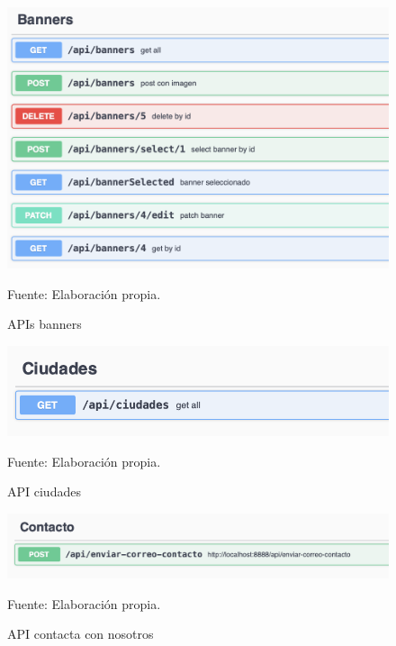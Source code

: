 \begin{figure}[H]
\begin{center}
\includegraphics[scale=0.8]{./Images/APIbanners.png}
\caption{APIs banners} Fuente: Elaboración propia.

\label{fig:fig7}

\end{center}
\end{figure}

\begin{figure}[H]
\begin{center}
\includegraphics[scale=0.9]{./Images/APIciudades.png}
\caption{API ciudades} Fuente: Elaboración propia.

\label{fig:fig8}

\end{center}
\end{figure}

\begin{figure}[H]
\begin{center}
\includegraphics[scale=0.8]{./Images/APIcontacto.png}
\caption{API contacta con nosotros} Fuente: Elaboración propia.

\label{fig:fig9}

\end{center}
\end{figure}